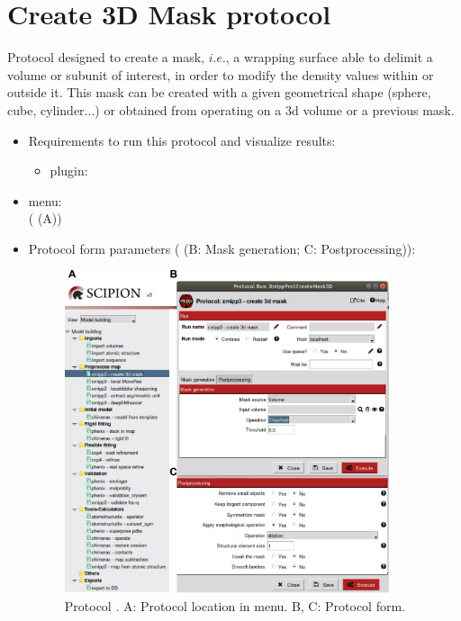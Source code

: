 \section{Create 3D Mask protocol}
\label{app:create3DMask}%

Protocol designed to create a mask, $i.e.$, a wrapping surface able to delimit a volume or subunit of interest, in order to modify the density values within or outside it. This mask can be created with a given geometrical shape (sphere, cube, cylinder...) or obtained from operating on a 3d volume or a previous mask.

\begin{itemize}
 \item Requirements to run this protocol and visualize results:
    \begin{itemize}
        \item \scipion plugin: 
    \end{itemize}
 \item \scipion menu:\\
   ( (A))
  
 \item Protocol form parameters ( (B: Mask generation; C: Postprocessing)):
  
    \begin{figure}[H]
     \centering 
     \captionsetup{width=.7\linewidth} 
     \includegraphics[width=0.90\textwidth]{Images_appendix/Fig206}
     \caption{Protocol . A: Protocol location in \scipion menu. B, C: Protocol form.}
     \label{fig:create3DMask_1}
    \end{figure}
    

\end{itemize}
